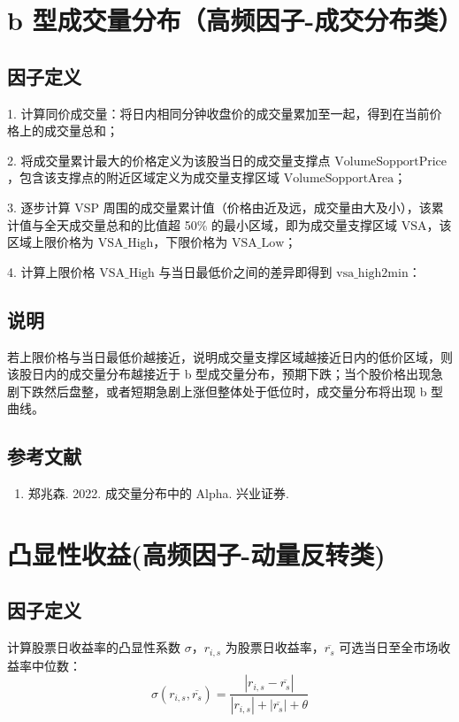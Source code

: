 \documentclass{article}
\begin{document}
\section{b 型成交量分布（高频因子-成交分布类）}

\subsection{因子定义}

1. 计算同价成交量：将日内相同分钟收盘价的成交量累加至一起，得到在当前价格上的成交量总和；

2. 将成交量累计最大的价格定义为该股当日的成交量支撑点 \( \mathrm{VolumeSopportPrice} \)，包含该支撑点的附近区域定义为成交量支撑区域 \( \mathrm{VolumeSopportArea} \)；

3. 逐步计算 \( \mathrm{VSP} \) 周围的成交量累计值（价格由近及远，成交量由大及小），该累计值与全天成交量总和的比值超 50\% 的最小区域，即为成交量支撑区域 \( \mathrm{VSA} \)，该区域上限价格为 \( \mathrm{VSA\_High} \)，下限价格为 \( \mathrm{VSA\_Low} \)；

4. 计算上限价格 \( \mathrm{VSA\_High} \) 与当日最低价之间的差异即得到 \( \mathrm{vsa\_high2min} \)：

\subsection{说明}
若上限价格与当日最低价越接近，说明成交量支撑区域越接近日内的低价区域，则该股日内的成交量分布越接近于 b 型成交量分布，预期下跌；当个股价格出现急剧下跌然后盘整，或者短期急剧上涨但整体处于低位时，成交量分布将出现 b 型曲线。

\subsection{参考文献}
\begin{enumerate}
    \item 郑兆森. 2022. 成交量分布中的 Alpha. 兴业证券.
\end{enumerate}

\section{凸显性收益(高频因子-动量反转类)}

\subsection{因子定义}
计算股票日收益率的凸显性系数 \( \sigma \)，\( r_{i,s} \) 为股票日收益率，\( \overline{r_s} \) 可选当日至全市场收益率中位数：
\begin{equation}
    \sigma(r_{i,s}, \overline{r_s}) = \frac{|r_{i,s} - \overline{r_s}|}{|r_{i,s}| + |\overline{r_s}| + \theta}
\end{equation}
\end{document}
